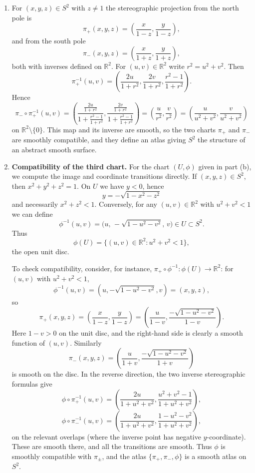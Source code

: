 \begin{solution}
\begin{enumerate}[label=\textnormal{(\alph*)}]
\item
For $(x,y,z)\in S^2$ with $z\neq 1$ the stereographic projection from the north
		pole is
		\[
		\pi_+(x,y,z) = \left(\frac{x}{1-z}, \frac{y}{1-z}\right),
		\]
		and from the south pole
		\[
		\pi_-(x,y,z) = \left(\frac{x}{1+z}, \frac{y}{1+z}\right),
		\]
		both with inverses defined on $\mathbb{R}^2$.
		For $(u,v)\in\mathbb{R}^2$ write $r^2 = u^2+v^2$.  Then
		\[
		\pi_+^{-1}(u,v)
		= \left(
		\frac{2u}{1+r^2},
		\frac{2v}{1+r^2},
		\frac{r^2-1}{1+r^2}
		\right).
		\]
		Hence
		\[
		\pi_- \circ \pi_+^{-1}(u,v)
		= \left(
		\frac{\frac{2u}{1+r^2}}{1+\frac{r^2-1}{1+r^2}},
		\frac{\frac{2v}{1+r^2}}{1+\frac{r^2-1}{1+r^2}}
		\right)
		= \left(
		\frac{u}{r^2},
		\frac{v}{r^2}
		\right)
		= \left(
		\frac{u}{u^{2}+v^{2}},
		\frac{v}{u^{2}+v^{2}}
		\right)
		\]
		on $\mathbb{R}^2 \setminus \{0\}$.  This map and its inverse are smooth,
		so the two charts $\pi_+$ and $\pi_-$ are smoothly compatible, and they define
		an atlas giving $S^2$ the structure of an abstract smooth surface.
		
		\medskip
		
		\item
\textbf{Compatibility of the third chart.}
For the chart $(U,\phi)$ given in part (b), we compute the image and
coordinate transitions directly.
		If $(x,y,z)\in S^2$, then $x^2+y^2+z^2=1$.  On $U$ we have $y<0$, hence
		\[
		y = -\sqrt{1-x^2-z^2}
		\]
		and necessarily $x^2+z^2 < 1$.
		Conversely, for any $(u,v)\in\mathbb{R}^2$ with $u^2+v^2<1$ we can define
		\[
		\phi^{-1}(u,v) = \bigl(u,\,-\sqrt{1-u^2-v^2},\,v\bigr) \in U \subset S^2.
		\]
		Thus
		\[
		\phi(U) = \{(u,v)\in\mathbb{R}^2 : u^2+v^2<1\},
		\]
		the open unit disc.
		
		To check compatibility, consider, for instance,
		$\pi_+ \circ \phi^{-1} : \phi(U) \to \mathbb{R}^2$:
		for $(u,v)$ with $u^2+v^2<1$,
		\[
		\phi^{-1}(u,v) = (u,-\sqrt{1-u^2-v^2},v) = (x,y,z),
		\]
		so
		\[
		\pi_+(x,y,z)
		= \left(\frac{x}{1-z},\frac{y}{1-z}\right)
		= \left(
		\frac{u}{1-v},
		\frac{-\sqrt{1-u^2-v^2}}{1-v}
		\right).
		\]
		Here $1-v>0$ on the unit disc, and the right-hand side is clearly a smooth
		function of $(u,v)$.  Similarly
		\[
		\pi_-(x,y,z)
		= \left(
		\frac{u}{1+v},
		\frac{-\sqrt{1-u^2-v^2}}{1+v}
		\right)
		\]
		is smooth on the disc.  In the reverse direction, the two inverse stereographic formulas give
\[
\phi\circ\pi_+^{-1}(u,v)
 =\left(\frac{2u}{1+u^2+v^2},\frac{u^2+v^2-1}{1+u^2+v^2}\right),
\]
\[
\phi\circ\pi_-^{-1}(u,v)
 =\left(\frac{2u}{1+u^2+v^2},\frac{1-u^2-v^2}{1+u^2+v^2}\right),
\]
on the relevant overlaps (where the inverse point has negative $y$-coordinate).
These are smooth there, and all the transitions are smooth.
Thus $\phi$ is smoothly compatible with $\pi_\pm$, and the atlas
		$\{\pi_+,\pi_-,\phi\}$ is a smooth atlas on $S^2$.
		

\end{enumerate}
\end{solution}

